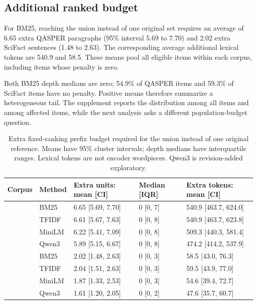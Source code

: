 \documentclass[twoside,a4paper,11pt]{article}
\begin{document}
\subsection{Additional ranked budget}
For BM25, reaching the union instead of one original set requires an average of 6.65 extra QASPER paragraphs (95\% interval 5.69 to 7.70) and 2.02 extra SciFact sentences (1.48 to 2.63). The corresponding average additional lexical tokens are 540.9 and 58.5. These means pool all eligible items within each corpus, including items whose penalty is zero.

Both BM25 depth medians are zero; 54.9\% of QASPER items and 59.3\% of SciFact items have no penalty. Positive means therefore summarize a heterogeneous tail. The supplement reports the distribution among all items and among affected items, while the next analysis asks a different population-budget question.

\begin{table}[!htbp]\centering\small\caption{Extra fixed-ranking prefix budget required for the union instead of one original reference. Means have 95\% cluster intervals; depth medians have interquartile ranges. Lexical tokens are not encoder wordpieces. Qwen3 is revision-added exploratory.}
\begin{tabular}{>{\raggedright\arraybackslash}p{49.0pt}>{\raggedright\arraybackslash}p{41.0pt}>{\raggedright\arraybackslash}p{100.0pt}>{\raggedright\arraybackslash}p{67.0pt}>{\raggedright\arraybackslash}p{115.0pt}}
\toprule
\textbf{Corpus} & \textbf{Method} & \textbf{Extra units: mean [CI]} & \textbf{Median [IQR]} & \textbf{Extra tokens: mean [CI]} \\
\midrule
{QASPER} & {BM25} & {6.65 [5.69, 7.70]} & {0 [0, 7]} & {540.9 [463.7, 624.0]} \\
{QASPER} & {TFIDF} & {6.61 [5.67, 7.63]} & {0 [0, 8]} & {540.9 [463.7, 623.8]} \\
{QASPER} & {MiniLM} & {6.22 [5.41, 7.09]} & {0 [0, 8]} & {509.3 [440.3, 581.4]} \\
{QASPER} & {Qwen3} & {5.89 [5.15, 6.67]} & {0 [0, 8]} & {474.2 [414.2, 537.9]} \\
{SciFact} & {BM25} & {2.02 [1.48, 2.63]} & {0 [0, 3]} & {58.5 [43.0, 76.3]} \\
{SciFact} & {TFIDF} & {2.04 [1.51, 2.63]} & {0 [0, 3]} & {59.5 [43.9, 77.0]} \\
{SciFact} & {MiniLM} & {1.87 [1.33, 2.53]} & {0 [0, 3]} & {54.6 [39.4, 72.7]} \\
{SciFact} & {Qwen3} & {1.61 [1.20, 2.05]} & {0 [0, 2]} & {47.6 [35.7, 60.7]} \\
\bottomrule\end{tabular}\end{table}
\end{document}
